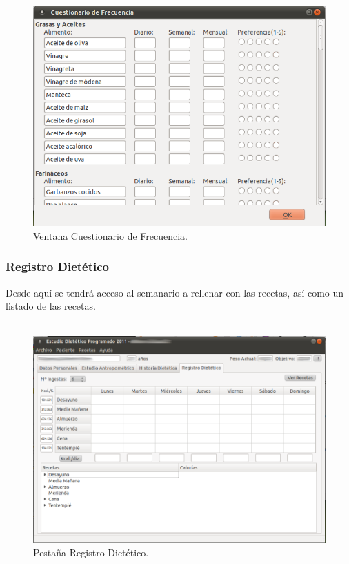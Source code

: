 \begin{enumerate}
\begin{figure}[H]
\begin{center}
    \includegraphics[scale=0.5]{../../Image/cuestfrec.png}
  \end{center}
  \caption{Ventana Cuestionario de Frecuencia.}
\end{figure}

\end{enumerate}


\subsubsection{Registro Dietético}
Desde aquí se tendrá acceso al semanario a rellenar con las recetas, así como un listado de las recetas.\\\\
\begin{figure}[H]
  \label{cuestfrec}
  \begin{center}
    \includegraphics[scale=0.5]{../Image/paciente-registro.png}
  \end{center}
  \caption{Pestaña Registro Dietético.}
\end{figure}

